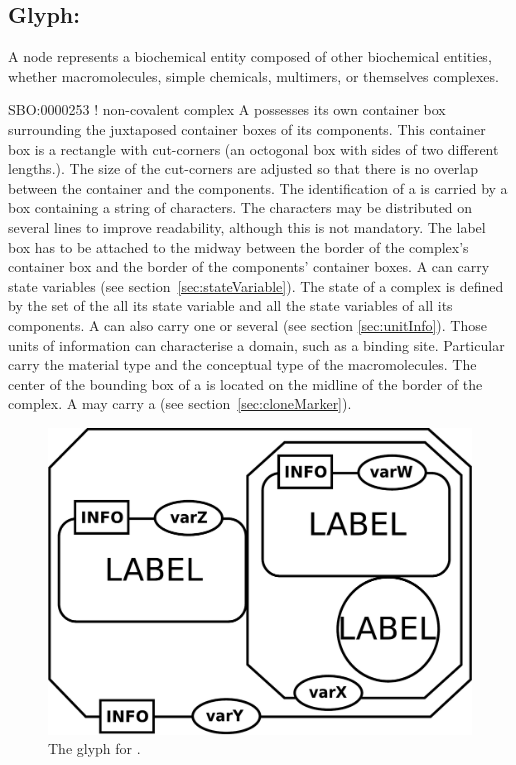 \subsection{Glyph: }\label{sec:complex}

A  node represents a biochemical entity composed of other biochemical entities, whether macromolecules, simple chemicals, multimers, or themselves complexes. 

\begin{glyphDescription}
\glyphSboTerm SBO:0000253 ! non-covalent complex
\glyphContainer A  possesses its own container box
  surrounding the juxtaposed container boxes of its components. This container box is a rectangle with cut-corners (an octogonal box with sides of two different lengths.). The size of the cut-corners are adjusted so that there is no overlap between the container and the components.
\glyphLabel The identification of a 
  is carried by a box containing a string of characters. The
  characters may be distributed on several lines to improve
  readability, although this is not mandatory.  The label box has to
  be attached to the midway between the border of the complex's
  container box and the border of the components' container boxes.
\glyphAux A  can carry state variables (see section~\ref{sec:stateVariable}). The state of a complex is defined by the set of the all its state variable and all the state variables of all its components.  A  can also carry one or several  (see section \ref{sec:unitInfo}). Those units of information can characterise a
  domain, such as a binding site. Particular  carry the material type and the conceptual type of the macromolecules. 
  The center of the bounding box of a  is
  located on the midline of the border of the complex. A  may
  carry a  (see section~\ref{sec:cloneMarker}).
\end{glyphDescription}


\begin{figure}[H]
  \centering
  \includegraphics[scale = 0.3]{images/complex}
  \caption{The \PD glyph for .}
  \label{fig:complex}
\end{figure}
